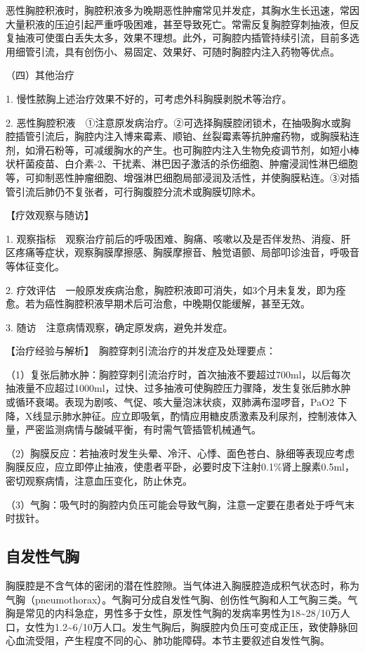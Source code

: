 恶性胸腔积液时，胸腔积液多为晚期恶性肿瘤常见并发症，其胸水生长迅速，常因大量积液的压迫引起严重呼吸困难，甚至导致死亡。常需反复胸腔穿刺抽液，但反复抽液可使蛋白丢失太多，效果不理想。此外，可胸腔内插管持续引流，目前多选用细管引流，具有创伤小、易固定、效果好、可随时胸腔内注入药物等优点。

{（四）其他治疗}

1. 慢性脓胸上述治疗效果不好的，可考虑外科胸膜剥脱术等治疗。

2.
恶性胸腔积液　①注意原发病治疗。②可选择胸膜腔闭锁术，在抽吸胸水或胸腔插管引流后，胸腔内注入博来霉素、顺铂、丝裂霉素等抗肿瘤药物，或胸膜粘连剂，如滑石粉等，可减缓胸水的产生。也可胸腔内注入生物免疫调节剂，如短小棒状杆菌疫苗、白介素-2、干扰素、淋巴因子激活的杀伤细胞、肿瘤浸润性淋巴细胞等，可抑制恶性肿瘤细胞、增强淋巴细胞局部浸润及活性，并使胸膜粘连。③对插管引流后肺仍不复张者，可行胸腹腔分流术或胸膜切除术。

【疗效观察与随访】

1.
观察指标　观察治疗前后的呼吸困难、胸痛、咳嗽以及是否伴发热、消瘦、肝区疼痛等症状，观察胸膜摩擦感、胸膜摩擦音、触觉语颤、局部叩诊浊音，呼吸音等体征变化。

2.
疗效评估　一般原发疾病治愈，胸腔积液即可消失，如3个月未复发，即为痊愈。若为癌性胸腔积液早期术后可治愈，中晚期仅能缓解，甚至无效。

3. 随访　注意病情观察，确定原发病，避免并发症。

【治疗经验与解析】　胸腔穿刺引流治疗的并发症及处理要点：

（1）复张后肺水肿：胸腔穿刺引流治疗时，首次抽液不要超过700ml，以后每次抽液量不应超过1000ml，过快、过多抽液可使胸腔压力骤降，发生复张后肺水肿或循环衰竭。表现为剧咳、气促、咳大量泡沫状痰，双肺满布湿啰音，PaO{2}
下降，X线显示肺水肿征。应立即吸氧，酌情应用糖皮质激素及利尿剂，控制液体入量，严密监测病情与酸碱平衡，有时需气管插管机械通气。

（2）胸膜反应：若抽液时发生头晕、冷汗、心悸、面色苍白、脉细等表现应考虑胸膜反应，应立即停止抽液，使患者平卧，必要时皮下注射0.1\%肾上腺素0.5ml，密切观察病情，注意血压变化，防止休克。

（3）气胸：吸气时的胸腔内负压可能会导致气胸，注意一定要在患者处于呼气末时拔针。

\subsection{自发性气胸}

胸膜腔是不含气体的密闭的潜在性腔隙。当气体进入胸膜腔造成积气状态时，称为气胸（pneumothorax）。气胸可分成自发性气胸、创伤性气胸和人工气胸三类。气胸是常见的内科急症，男性多于女性，原发性气胸的发病率男性为18\textasciitilde{}28/10万人口，女性为1.2\textasciitilde{}6/10万人口。发生气胸后，胸膜腔内负压可变成正压，致使静脉回心血流受阻，产生程度不同的心、肺功能障碍。本节主要叙述自发性气胸。

